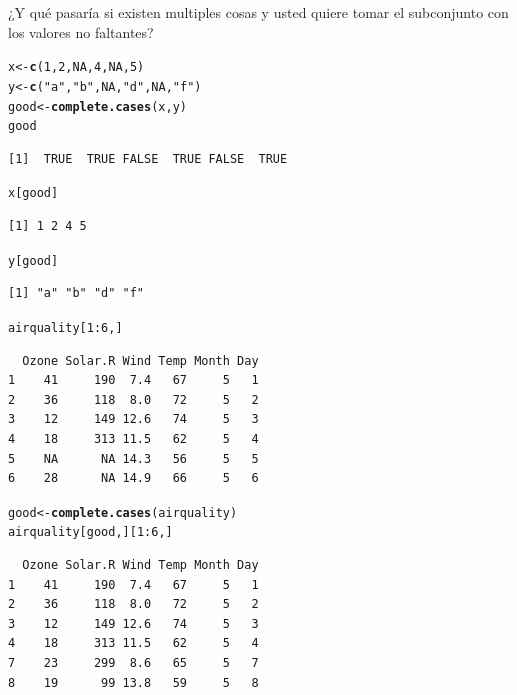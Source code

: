 \documentclass{article}\usepackage[]{graphicx}\usepackage[]{color}
\makeatletter
\newcommand{\hlnum}[1]{\textcolor[rgb]{0.686,0.059,0.569}{#1}}%
\newcommand{\hlstr}[1]{\textcolor[rgb]{0.192,0.494,0.8}{#1}}%
\newcommand{\hlopt}[1]{\textcolor[rgb]{0,0,0}{#1}}%
\newcommand{\hlstd}[1]{\textcolor[rgb]{0.345,0.345,0.345}{#1}}%
\newcommand{\hlkwb}[1]{\textcolor[rgb]{0.69,0.353,0.396}{#1}}%
\newcommand{\hlkwd}[1]{\textcolor[rgb]{0.737,0.353,0.396}{\textbf{#1}}}%
\newenvironment{kframe}{%
 \def\at@end@of@kframe{}%
 \ifinner\ifhmode%
  \def\at@end@of@kframe{\end{minipage}}%
  \begin{minipage}{\columnwidth}%
 \fi\fi%
 \def\FrameCommand##1{\hskip\@totalleftmargin \hskip-\fboxsep
 \colorbox{shadecolor}{##1}\hskip-\fboxsep
     \hskip-\linewidth \hskip-\@totalleftmargin \hskip\columnwidth}%
 \MakeFramed {\advance\hsize-\width
   \@totalleftmargin\z@ \linewidth\hsize
   \@setminipage}}%
 {\par\unskip\endMakeFramed%
 \at@end@of@kframe}
\newenvironment{knitrout}{}{} %
\makeatother
\begin{document}
    ¿Y qué pasaría si existen multiples cosas y usted quiere tomar el subconjunto con los valores no faltantes?
\begin{knitrout}
\color{fgcolor}\begin{kframe}
\begin{alltt}
  \hlstd{x} \hlkwb{<-} \hlkwd{c}\hlstd{(}\hlnum{1}\hlstd{,} \hlnum{2}\hlstd{,} \hlnum{NA}\hlstd{,} \hlnum{4}\hlstd{,} \hlnum{NA}\hlstd{,} \hlnum{5}\hlstd{)}
  \hlstd{y} \hlkwb{<-} \hlkwd{c}\hlstd{(}\hlstr{"a"}\hlstd{,} \hlstr{"b"}\hlstd{,} \hlnum{NA}\hlstd{,} \hlstr{"d"}\hlstd{,} \hlnum{NA}\hlstd{,} \hlstr{"f"}\hlstd{)}
  \hlstd{good} \hlkwb{<-} \hlkwd{complete.cases}\hlstd{(x, y)}
  \hlstd{good}
\end{alltt}
\begin{verbatim}
[1]  TRUE  TRUE FALSE  TRUE FALSE  TRUE
\end{verbatim}
\begin{alltt}
  \hlstd{x[good]}
\end{alltt}
\begin{verbatim}
[1] 1 2 4 5
\end{verbatim}
\begin{alltt}
  \hlstd{y[good]}
\end{alltt}
\begin{verbatim}
[1] "a" "b" "d" "f"
\end{verbatim}
\end{kframe}
\end{knitrout}

\begin{knitrout}
\color{fgcolor}\begin{kframe}
\begin{alltt}
  \hlstd{airquality[}\hlnum{1}\hlopt{:}\hlnum{6}\hlstd{, ]}
\end{alltt}
\begin{verbatim}
  Ozone Solar.R Wind Temp Month Day
1    41     190  7.4   67     5   1
2    36     118  8.0   72     5   2
3    12     149 12.6   74     5   3
4    18     313 11.5   62     5   4
5    NA      NA 14.3   56     5   5
6    28      NA 14.9   66     5   6
\end{verbatim}
\begin{alltt}
  \hlstd{good} \hlkwb{<-} \hlkwd{complete.cases}\hlstd{(airquality)}
  \hlstd{airquality[good, ][}\hlnum{1}\hlopt{:}\hlnum{6}\hlstd{, ]}
\end{alltt}
\begin{verbatim}
  Ozone Solar.R Wind Temp Month Day
1    41     190  7.4   67     5   1
2    36     118  8.0   72     5   2
3    12     149 12.6   74     5   3
4    18     313 11.5   62     5   4
7    23     299  8.6   65     5   7
8    19      99 13.8   59     5   8
\end{verbatim}
\end{kframe}
\end{knitrout}
\end{document}
